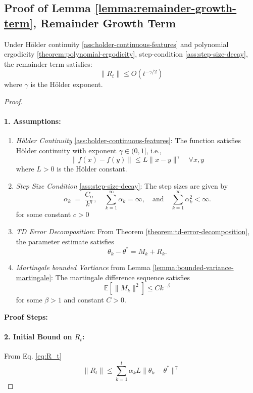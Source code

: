 \subsection{Proof of Lemma \ref{lemma:remainder-growth-term}, Remainder Growth Term}
\label{app:proof-remainder-growth-term}

\begin{lemma}
Under Hölder continuity \ref{ass:holder-continuous-features} and polynomial ergodicity \ref{theorem:polynomial-ergodicity}, step-condition \ref{ass:step-size-decay}, the remainder term satisfies:
\[
\|R_t\| \leq O(t^{-\gamma/2})
\]
where \( \gamma \) is the H\"older exponent.
\end{lemma}

\begin{proof}
\;\newline
\paragraph{1. Assumptions:}
\begin{enumerate}
    \item \emph{Hölder Continuity} \ref{ass:holder-continuous-features}: The function satisfies Hölder continuity with exponent \( \gamma \in (0, 1] \), i.e.,
    \[
    \|f(x) - f(y)\| \leq L \|x - y\|^\gamma \quad \forall x, y
    \]
    where \( L > 0 \) is the Hölder constant.
    
    \item \emph{Step Size Condition} \ref{ass:step-size-decay}: The step sizes are given by
    \[
    \alpha_k \;=\; \frac{C_\alpha}{k^\eta},\quad\sum_{k=1}^{\infty} \alpha_k = \infty,
\quad\text{and}\quad
\sum_{k=1}^{\infty} \alpha_k^2 < \infty.
    \]
    for some constant \( c > 0 \)

    \item \emph{TD Error Decomposition}: From Theorem \ref{theorem:td-error-decomposition}, the parameter estimate satisfies
    \[
    \theta_k - \theta^* = M_k + R_k.
    \]
    
    \item \emph{Martingale bounded Vartiance} from Lemma \ref{lemma:bounded-variance-martingale}: The martingale difference sequence satisfies
    \[
    \mathbb{E}[\|M_k\|^2] \leq C k^{-\beta}
    \]
    for some \( \beta > 1 \) and constant \( C > 0 \).
\end{enumerate}

\textbf{Proof Steps:}

\paragraph{2. Initial Bound on \( R_t \):}
From Eq. \ref{eq:R_t}
\[
\|R_t\| \leq \sum_{k=1}^t \alpha_k L \|\theta_k - \theta^*\|^\gamma
\]


\end{proof}
